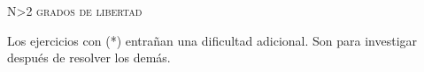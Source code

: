 \documentclass[11pt, spanish, a4paper, twopage]{article}
\begin{document}
\begin{center}
	\textsc{\LARGE N\textgreater2 grados de libertad}
\end{center}


Los ejercicios con (*) entrañan una dificultad adicional. Son para investigar después de resolver los demás.


\begin{enumerate}




\end{enumerate}
\end{document}
